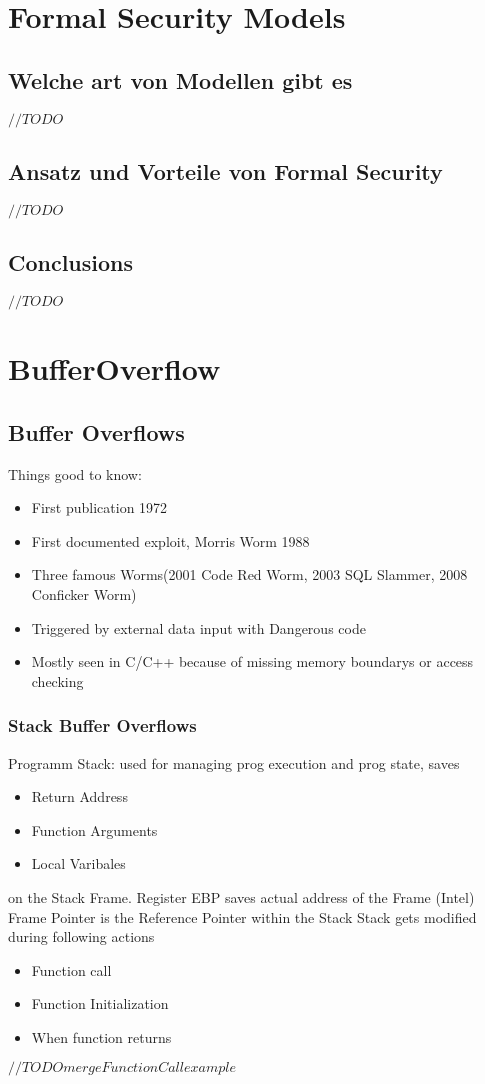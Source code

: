\documentclass[a4paper, 12pt]{article}
\begin{document}
\section{Formal Security Models}
\subsection{Welche art von Modellen gibt es}
$ //TODO $
\subsection{Ansatz und Vorteile von Formal Security}
$ //TODO $
\subsection{Conclusions}
$ //TODO $

\section{BufferOverflow}
\subsection{Buffer Overflows}
Things good to know:
\begin{itemize}
\item First publication 1972
\item First documented exploit, Morris Worm 1988
\item Three famous Worms(2001 Code Red Worm, 2003 SQL Slammer, 2008 Conficker Worm)
\item Triggered by external data input with Dangerous code
\item Mostly seen in C/C++ because of missing memory boundarys or access checking
\end{itemize}
\subsubsection{Stack Buffer Overflows}
Programm Stack: used for managing prog execution and prog state, saves 
\begin{itemize}
\item Return Address
\item Function Arguments
\item Local Varibales
\end{itemize}
on the Stack Frame.
Register EBP saves actual address of the Frame (Intel)
Frame Pointer is the Reference Pointer within the Stack
Stack gets modified during following actions
\begin{itemize}
\item Function call
\item Function Initialization
\item When function returns
\end{itemize}
$ //TODO merge FunctionCall example $
\end{document}
